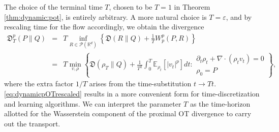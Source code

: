 \documentclass{amsart}
\newcommand{\rb}[1]{#1} %
\newcommand{\R}{\mathbb{R}}
\theoremstyle{definition}
\theoremstyle{remark}
\numberwithin{equation}{section}
\begin{document}
The choice of the terminal time $T$, chosen to be $T = 1$ in Theorem \ref{thm:dynamic:pot}, is entirely arbitrary. A more natural choice is $T=\varepsilon$, and by rescaling time for the flow accordingly, we obtain the divergence
\begin{eqnarray}\label{dynamic.formulation}
\mathfrak{D}^p_T(P\|Q) &=&  T \inf_{R\in \mathcal{P}(\R^d)}\left\{  \mathfrak{D}(R\|Q) + \frac{1}{T} W_p^p(P,R) \right\} \nonumber \\
    & =& T \min_{v,\rho} \left\{  \mathfrak{D} (\rho_T\|Q) + \rb{\frac{1}{T^2} }\int_0^T \mathbb{E}_{\rho_t}\left[|v_t|^p\right] dt : 
    \begin{array}{c}
    \partial_t \rho_t + \nabla \cdot(\rho_t v_t) = 0 \\  
    \rho_0 = P
    \end{array}
    \right\},
    \label{eq:dynamicpOTrescaled}
\end{eqnarray}
\rb{where the extra factor $1/T$ arises from the time-substitution $t \rightarrow Tt$.}
\eqref{eq:dynamicpOTrescaled} results in a more convenient form for time-discretization and learning algorithms. We can interpret the parameter $T$ as the time-horizon  allotted for the Wasserstein component of the proximal OT divergence to carry out the transport.
\end{document}

